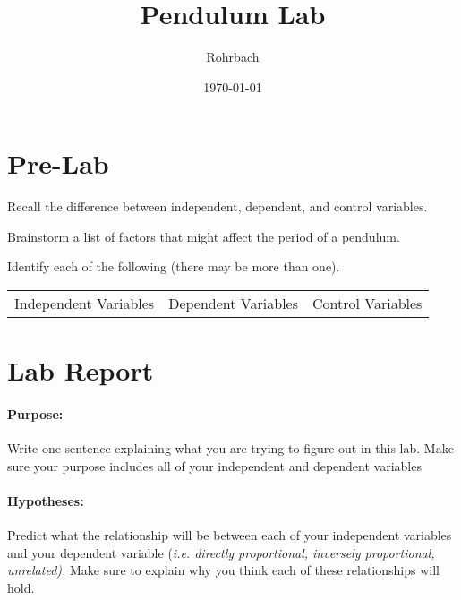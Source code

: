 \documentclass[10pt]{exam}
\title{Pendulum Lab}
\author{Rohrbach}
\date{\today}
\begin{document}
\maketitle

\section*{Pre-Lab}


\begin{questions}



\question
  Recall the difference between independent, dependent, and control variables.
  \vs 

\question
  Brainstorm a list of factors that might affect the period of a pendulum.
  \vs 

\question
  Identify each of the following (there may be more than one).

  \begin{center}
    \begin{tabular}
      { m{} | m{}| m{} } 
      Independent Variables & 
      Dependent Variables   & 
      Control Variables  \\[6em]
    \end{tabular}
  \end{center}

\end{questions}

\section*{Lab Report}

\paragraph{Purpose:} 
  Write one sentence explaining what you are trying to figure out in this lab. Make sure your purpose includes all of your independent and dependent variables

  \vs

\paragraph{Hypotheses:} 
  Predict what the relationship will be between each of your independent variables and your dependent variable (\emph{i.e. directly proportional, inversely proportional, unrelated).} Make sure to explain why you think each of these relationships will hold.
\end{document}
